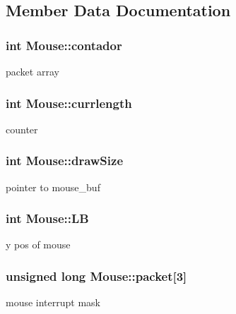 \subsection{Member Data Documentation}
\subsubsection[{\texorpdfstring{contador}{contador}}]{\setlength{\rightskip}{0pt plus 5cm}int Mouse\+::contador}\hypertarget{structMouse_a8dc967db73702ddb693145652f10071b}{}\label{structMouse_a8dc967db73702ddb693145652f10071b}
packet array 
\subsubsection[{\texorpdfstring{currlength}{currlength}}]{\setlength{\rightskip}{0pt plus 5cm}int Mouse\+::currlength}\hypertarget{structMouse_a5db413bdb085f7618c43c4740d8058dd}{}\label{structMouse_a5db413bdb085f7618c43c4740d8058dd}
counter 
\subsubsection[{\texorpdfstring{draw\+Size}{drawSize}}]{\setlength{\rightskip}{0pt plus 5cm}int Mouse\+::draw\+Size}\hypertarget{structMouse_a2f336c5b976d203e94cfd39cdb605bd4}{}\label{structMouse_a2f336c5b976d203e94cfd39cdb605bd4}
pointer to mouse\+\_\+buf 
\subsubsection[{\texorpdfstring{LB}{LB}}]{\setlength{\rightskip}{0pt plus 5cm}int Mouse\+::\+LB}\hypertarget{structMouse_a6ffdaafd5ac181e36e9ad74dc3c188eb}{}\label{structMouse_a6ffdaafd5ac181e36e9ad74dc3c188eb}
y pos of mouse 
\subsubsection[{\texorpdfstring{packet}{packet}}]{\setlength{\rightskip}{0pt plus 5cm}unsigned long Mouse\+::packet\mbox{[}3\mbox{]}}\hypertarget{structMouse_a8bfb0c35eb14423f5086a355d52dc733}{}\label{structMouse_a8bfb0c35eb14423f5086a355d52dc733}
mouse interrupt mask 
